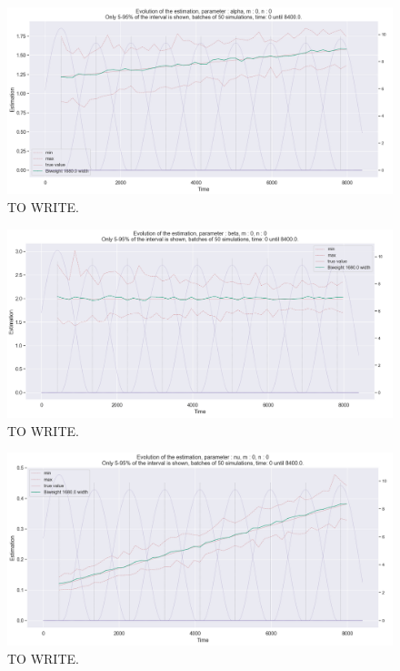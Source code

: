 \begin{figure}
\centering
\includegraphics[width = 0.90 \textwidth]{../imag/chap3/1/Figure_2.png}
\caption{TO WRITE.}
\label{fig:first_estimate_1_alpha}
\end{figure}

\begin{figure}
\centering
\includegraphics[width = 0.90 \textwidth]{../imag/chap3/1/Figure_3.png}
\caption{TO WRITE.}
\label{fig:first_estimate_1_beta}
\end{figure}

\begin{figure}
\centering
\includegraphics[width = 0.90 \textwidth]{../imag/chap3/1/Figure_4.png}
\caption{TO WRITE.}
\label{fig:first_estimate_1_nu}
\end{figure}



















